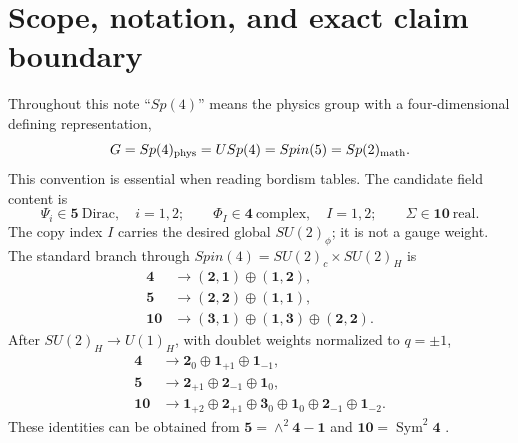 \documentclass[11pt]{article}
\theoremstyle{definition}
\theoremstyle{remark}
\newcommand{\Sym}{\operatorname{Sym}}
\begin{document}
\tableofcontents

\section{Scope, notation, and exact claim boundary}

Throughout this note ``\(Sp(4)\)'' means the physics group with a
four-dimensional defining representation,
\begin{equation}
 G=Sp(4)_{\rm phys}=USp(4)=Spin(5)=Sp(2)_{\rm math}.
 \label{eq:notation}
\end{equation}
This convention is essential when reading bordism tables.  The candidate
field content is
\begin{equation}
 \Psi_i\in\bm5\ \text{Dirac},\quad i=1,2;
 \qquad
 \Phi_I\in\bm4\ \text{complex},\quad I=1,2;
 \qquad
 \Sigma\in\bm{10}\ \text{real}.
 \label{eq:fields}
\end{equation}
The copy index \(I\) carries the desired global \(SU(2)_\phi\); it is not a
gauge weight.  The standard branch through
\(Spin(4)=SU(2)_c\times SU(2)_H\) is
\begin{align}
 \bm4&\longrightarrow(\bm2,\bm1)\oplus(\bm1,\bm2),
 \label{eq:four-spin4}\\
 \bm5&\longrightarrow(\bm2,\bm2)\oplus(\bm1,\bm1),
 \label{eq:five-spin4}\\
 \bm{10}&\longrightarrow(\bm3,\bm1)\oplus(\bm1,\bm3)
                       \oplus(\bm2,\bm2).
 \label{eq:ten-spin4}
\end{align}
After \(SU(2)_H\to U(1)_H\), with doublet weights normalized to
\(q=\pm1\),
\begin{align}
 \bm4&\to\bm2_0\oplus\bm1_{+1}\oplus\bm1_{-1},
 \label{eq:four-u1}\\
 \bm5&\to\bm2_{+1}\oplus\bm2_{-1}\oplus\bm1_0,
 \label{eq:five-u1}\\
 \bm{10}&\to\bm1_{+2}\oplus\bm2_{+1}\oplus\bm3_0\oplus\bm1_0
                 \oplus\bm2_{-1}\oplus\bm1_{-2}.
 \label{eq:ten-u1}
\end{align}
These identities can be obtained from
\(\bm5=\wedge^2\bm4-\bm1\) and
\(\bm{10}=\Sym^2\bm4\) \cite{Slansky1981}.
\end{document}
